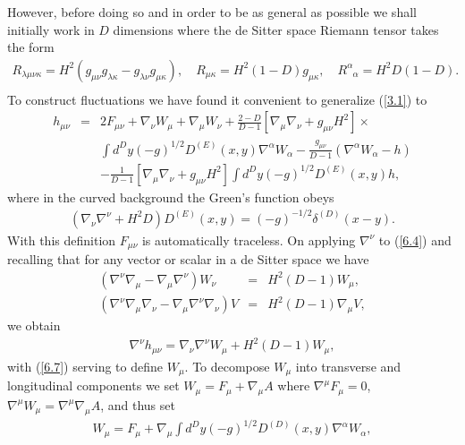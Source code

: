However, before doing so and in order to be as general as possible we shall initially work in $D$ dimensions where the de Sitter space Riemann tensor takes the form
%
\begin{eqnarray}
R_{\lambda\mu\nu\kappa}=H^2(g_{\mu\nu}g_{\lambda\kappa}-g_{\lambda\nu}g_{\mu\kappa}),
\quad R_{\mu\kappa}=H^2(1-D)g_{\mu\kappa},\quad R^{\alpha}_{\phantom{\alpha}\alpha}=H^2D(1-D).
\nonumber\\
\label{6.3}
\end{eqnarray}
% 
To construct fluctuations we have found it convenient to generalize (\ref{3.1}) to 
%
\begin{eqnarray}
h_{\mu\nu}&=&2F_{\mu\nu}+\nabla_{\nu}W_{\mu}+\nabla_{\mu}W_{\nu}+\frac{2-D}{D-1}\left[\nabla_{\mu}\nabla_{\nu}
+g_{\mu\nu}H^2\right]\times
\nonumber\\
&&\int d^Dy(-g)^{1/2}D^{(E)}(x,y)\nabla^{\alpha}W_{\alpha}
- \frac{g_{\mu\nu}}{D-1}(\nabla^{\alpha}W_{\alpha}-h)
\nonumber\\
&&-\frac{1}{D-1}\left[\nabla_{\mu}\nabla_{\nu}+g_{\mu\nu}H^2\right]\int d^Dy(-g)^{1/2}D^{(E)}(x,y)h,
\label{6.4}
\end{eqnarray}
%
where in the curved background the Green's function obeys
%
\begin{eqnarray}
\left(\nabla_{\nu}\nabla^{\nu}+H^2D\right)D^{(E)}(x,y)=(-g)^{-1/2}\delta^{(D)}(x-y).
\label{6.5}
\end{eqnarray}
%
With this definition $F_{\mu\nu}$ is automatically traceless. On applying $\nabla^{\nu}$ to (\ref{6.4}) and recalling that for any vector or scalar in a de Sitter space  we have
%
\begin{eqnarray}
(\nabla^{\nu}\nabla_{\mu}-\nabla_{\mu}\nabla^{\nu})W_{\nu}&=&H^2(D-1)W_{\mu},
\nonumber\\
(\nabla^{\nu}\nabla_{\mu}\nabla_{\nu}-\nabla_{\mu}\nabla^{\nu}\nabla_{\nu})V&=&H^2(D-1)\nabla_{\mu}V,
\label{6.6}
\end{eqnarray}
%
we obtain
%
\begin{eqnarray}
\nabla^{\nu}h_{\mu\nu}=\nabla_{\nu}\nabla^{\nu}W_{\mu}+H^2(D-1)W_{\mu},
\label{6.7}
\end{eqnarray}
%
with (\ref{6.7}) serving to define $W_{\mu}$. To decompose $W_{\mu}$ into transverse and longitudinal components we set $W_{\mu}=F_{\mu}+\nabla_{\mu}A$ where $\nabla^{\mu}F_{\mu}=0$, $\nabla^{\mu}W_{\mu}=\nabla^{\mu}\nabla_{\mu}A$, and thus set
%
\begin{eqnarray}
W_{\mu}=F_{\mu}+\nabla_{\mu}\int d^Dy(-g)^{1/2}D^{(D)}(x,y)\nabla^{\alpha}W_{\alpha},
\label{6.8}
\end{eqnarray}
